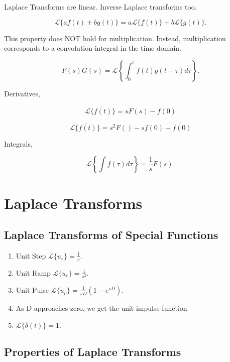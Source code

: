 \documentclass[12pt, a4paper]{report}
\begin{document}
  Laplace Transforms are linear. Inverse Laplace transforms too.

  \[
      \mathcal{L}\{af(t) + bg(t)\} = a \mathcal{L}\{f(t)\} + b \mathcal{L}\{g(t)\}
    .\]

  This property does NOT hold for multiplication. Instead, multiplication corresponds to a convolution integral in the time domain.

  \[
      F(s)G(s) = \mathcal{L}\left\{\int_0^t f(t)g(t - \tau) d\tau\right\}
    .\]

  Derivatives,

  \begin{equation}
    \mathcal{L}\{\dot{f(t)}\} = sF(s) - f(0)
  \end{equation}

  \begin{equation}
    \mathcal{L}\{\ddot{f(t)}\} = s ^2 F() - sf(0) - \dot{f(0)}
  \end{equation}

  Integrals,

  \[
      \mathcal{L}\left\{\int f(\tau)d \tau \right\} = \frac{1}{s} F(s)
    .\]


  \chapter{Laplace Transforms}

  \section{Laplace Transforms of Special Functions}

  \begin{enumerate}
    \item Unit Step $ \mathcal{L}\{u_s\} = \frac{1}{s}. $
    \item Unit Ramp $ \mathcal{L}\{u_r\} = \frac{1}{s ^2}. $
    \item Unit Pulse $ \mathcal{L}\{u_p\} = \frac{1}{sD} \left( 1-e^{sD} \right). $
    \item As D approaches zero, we get the unit impulse function
    \item $ \mathcal{L}\{\delta(t)\} = 1. $
  \end{enumerate}

  \section{Properties of Laplace Transforms}
\end{document}
